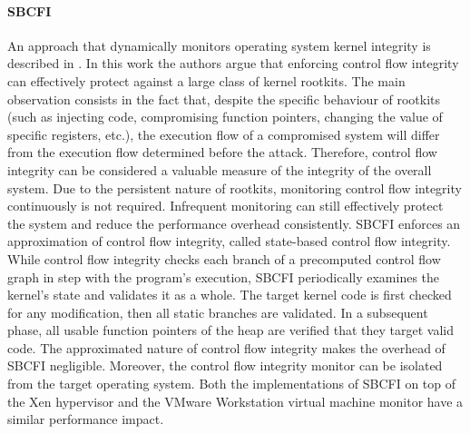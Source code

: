 \paragraph{SBCFI}
An approach that dynamically monitors operating system kernel integrity is described in \cite{SBCFI}. In this work the authors argue that enforcing control flow integrity can effectively protect against a large class of kernel rootkits. The main observation consists in the fact that, despite the specific behaviour of rootkits (such as injecting code, compromising function pointers, changing the value of specific registers, etc.), the execution flow of a compromised system will differ from the execution flow determined before the attack.
Therefore, control flow integrity can be considered a valuable measure of the integrity of the overall system.
Due to the persistent nature of rootkits, monitoring control flow integrity continuously is not required. Infrequent monitoring can still effectively protect the system and reduce the performance overhead consistently.
SBCFI enforces an approximation of control flow integrity, called state-based control flow integrity. While control flow integrity checks each branch of a precomputed control flow graph in step with the program's execution, SBCFI periodically examines the kernel's state and validates it as a whole.
The target kernel code is first checked for any modification, then all static branches are validated. In a subsequent phase, all usable function pointers of the heap are verified that they target valid code.
The approximated nature of control flow integrity makes the overhead of SBCFI negligible. Moreover, the control flow integrity monitor can be isolated from the target operating system. 
Both the implementations of SBCFI on top of the Xen hypervisor and the VMware Workstation virtual machine monitor have a similar performance impact.


